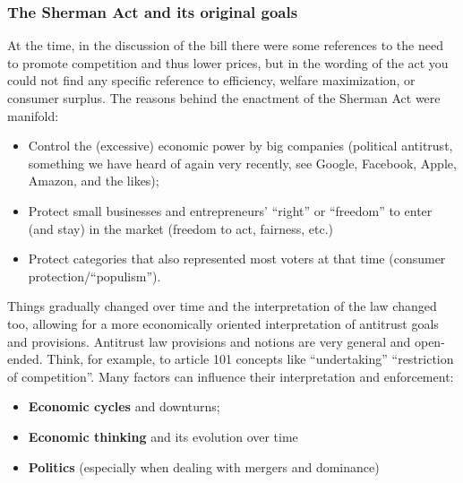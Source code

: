         \subsubsection{The Sherman Act and its original goals}
            At the time, in the discussion of the bill there were some references to the need to promote competition and thus lower prices, but in the wording of the act you could not find any specific reference to efficiency, welfare maximization, or consumer surplus. 
            The reasons behind the enactment of the Sherman Act were manifold:  
            \begin{itemize}
                \item Control the (excessive) economic power by big companies (political antitrust, something we have heard of again very recently, see Google, Facebook, Apple, Amazon, and the likes);
                \item Protect small businesses and entrepreneurs’ “right” or “freedom” to enter (and stay) in the market (freedom to act, fairness, etc.) 
                \item Protect categories that also represented most voters at that time (consumer protection/“populism”).  
            \end{itemize}

            Things gradually changed over time and the interpretation of the law changed too, allowing for a more economically oriented interpretation of antitrust goals and provisions. Antitrust law provisions and notions are very general and open-ended. Think, for example, to article 101 concepts like “undertaking” “restriction of competition”.
            Many factors can influence their interpretation and enforcement:
            \begin{itemize}
                \item \textbf{Economic cycles} and downturns;
                \item \textbf{Economic thinking} and its evolution over time
                \item \textbf{Politics} (especially when dealing with mergers and dominance)
            \end{itemize}

            
